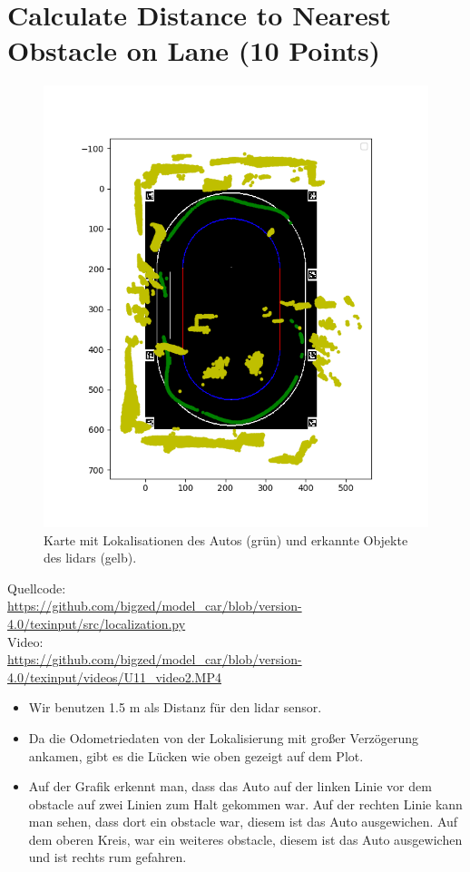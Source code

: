 \documentclass[10pt,oneside,a4paper]{article}
\begin{document}
  \section{Calculate Distance to Nearest Obstacle on Lane (10 Points)}
    \begin{figure}[h]
      \centering
      \includegraphics[scale=0.7]{pictures/circle_with_car_and_obstacles.png}
      \caption{Karte mit Lokalisationen des Autos (grün) und erkannte Objekte des lidars (gelb). }
    \end{figure}
    Quellcode: \\
    \url{https://github.com/bigzed/model_car/blob/version-4.0/texinput/src/localization.py} \\
    Video: \\
    \url{https://github.com/bigzed/model_car/blob/version-4.0/texinput/videos/U11_video2.MP4}
	\begin{itemize}
	    \item Wir benutzen 1.5 m als Distanz für den lidar sensor.
	    \item Da die Odometriedaten von der Lokalisierung mit großer Verzögerung ankamen, gibt es die Lücken wie oben gezeigt auf dem Plot.
	    \item Auf der Grafik erkennt man, dass das Auto auf der linken Linie vor dem obstacle auf zwei Linien zum Halt gekommen war. Auf der rechten Linie kann man sehen, dass dort ein obstacle war, diesem ist das Auto ausgewichen. Auf dem oberen Kreis, war ein weiteres obstacle, diesem ist das Auto ausgewichen und ist rechts rum gefahren. 
	\end{itemize}
\end{document}
